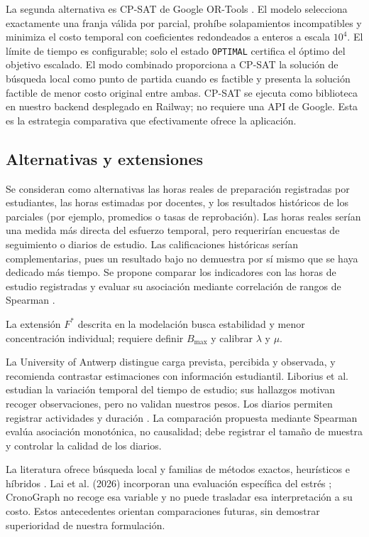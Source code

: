 \documentclass[conference]{IEEEtran}
\begin{document}
La segunda alternativa es CP-SAT de Google OR-Tools \cite{ortools}. El modelo selecciona exactamente una franja válida por parcial, prohíbe solapamientos incompatibles y minimiza el costo temporal con coeficientes redondeados a enteros a escala $10^4$. El límite de tiempo es configurable; solo el estado \texttt{OPTIMAL} certifica el óptimo del objetivo escalado. El modo combinado proporciona a CP-SAT la solución de búsqueda local como punto de partida cuando es factible y presenta la solución factible de menor costo original entre ambas. CP-SAT se ejecuta como biblioteca en nuestro backend desplegado en Railway; no requiere una API de Google. Esta es la estrategia comparativa que efectivamente ofrece la aplicación.

\subsection{Alternativas y extensiones}
Se consideran como alternativas las horas reales de preparación registradas por estudiantes, las horas estimadas por docentes, y los resultados históricos de los parciales (por ejemplo, promedios o tasas de reprobación). Las horas reales serían una medida más directa del esfuerzo temporal, pero requerirían encuestas de seguimiento o diarios de estudio. Las calificaciones históricas serían complementarias, pues un resultado bajo no demuestra por sí mismo que se haya dedicado más tiempo. Se propone comparar los indicadores con las horas de estudio registradas y evaluar su asociación mediante correlación de rangos de Spearman \cite{nist,unsd}.

La extensión $F^*$ descrita en la modelación busca estabilidad y menor concentración individual; requiere definir $B_{\max}$ y calibrar $\lambda$ y $\mu$.

La University of Antwerp distingue carga prevista, percibida y observada, y recomienda contrastar estimaciones con información estudiantil. Liborius et al. estudian la variación temporal del tiempo de estudio; sus hallazgos motivan recoger observaciones, pero no validan nuestros pesos. Los diarios permiten registrar actividades y duración \cite{antwerp,liborius,unsd}. La comparación propuesta mediante Spearman evalúa asociación monotónica, no causalidad; debe registrar el tamaño de muestra y controlar la calidad de los diarios.

La literatura ofrece búsqueda local \cite{caramia} y familias de métodos exactos, heurísticos e híbridos \cite{siew}. Lai et al. (2026) incorporan una evaluación específica del estrés \cite{lai}; CronoGraph no recoge esa variable y no puede trasladar esa interpretación a su costo. Estos antecedentes orientan comparaciones futuras, sin demostrar superioridad de nuestra formulación.
\end{document}
